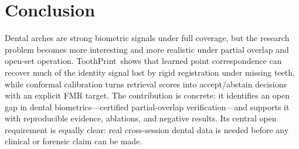 \documentclass[10pt,twocolumn]{article}
\newcommand{\method}{ToothPrint}
\begin{document}
\section{Conclusion}
Dental arches are strong biometric signals under full coverage, but the research problem becomes more interesting and more realistic under partial overlap and open-set operation. \method\ shows that learned point correspondence can recover much of the identity signal lost by rigid registration under missing teeth, while conformal calibration turns retrieval scores into accept/abstain decisions with an explicit FMR target. The contribution is concrete: it identifies an open gap in dental biometrics---certified partial-overlap verification---and supports it with reproducible evidence, ablations, and negative results. Its central open requirement is equally clear: real cross-session dental data is needed before any clinical or forensic claim can be made.

{\small


}
\end{document}
